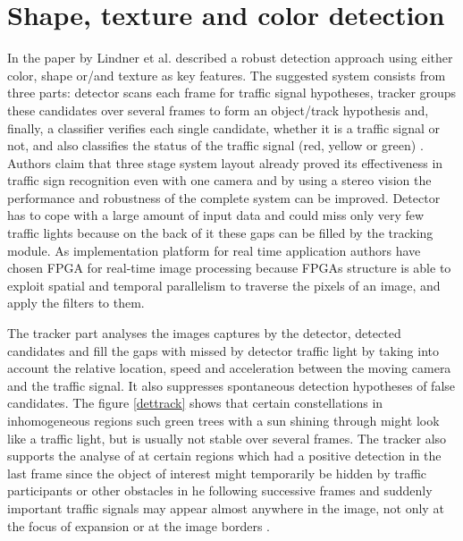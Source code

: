 \documentclass[letterpaper, 10 pt, conference]{ieeeconf} %
\begin{document}

\section{Shape, texture and color detection}
 
In the paper by Lindner et al. described a robust detection approach using either color, shape or/and texture as key features. The suggested system consists from three parts: detector scans each frame for traffic signal hypotheses, tracker groups these candidates over several frames to form an object/track hypothesis and, finally, a classifier verifies each single candidate, whether it is a traffic signal or not, and also classifies the status of the traffic signal (red, yellow or green) \cite{c6}. Authors claim that three stage system layout already proved its effectiveness in traffic sign recognition even with one camera and by using a stereo vision the performance and robustness of the complete system can be improved. Detector has to cope with a large amount of input data and could miss only very few traffic lights because on the back of it these gaps can be filled by the tracking module. As implementation platform for real time application authors have chosen FPGA for real-time image processing because FPGAs structure is able to exploit spatial and temporal parallelism to traverse the pixels of an image, and apply the filters to them.

The tracker part analyses the images captures by the detector, detected candidates and fill the gaps with missed by detector traffic light by taking into account the relative location, speed and acceleration between the moving camera and the traffic signal. It also suppresses spontaneous detection hypotheses of false candidates. The figure \ref{dettrack} shows that certain constellations in inhomogeneous regions such green trees with a sun shining through might look like a traffic light, but is usually not stable over several frames. The tracker also supports the analyse of at certain regions which had a positive detection in the last frame since the object of interest might temporarily be hidden by traffic participants or other obstacles in he following successive frames and suddenly important traffic signals may appear almost anywhere in the image, not only at the focus of expansion or at the image borders \cite{c6}.
\end{document}
